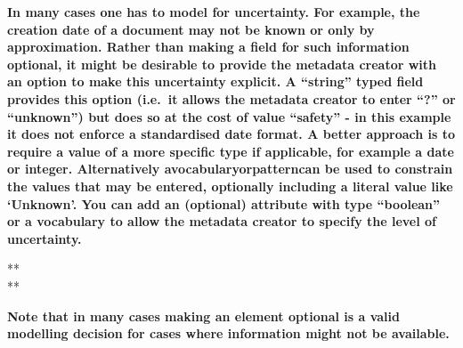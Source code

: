 \textbf{In many cases one has to model for uncertainty. For example, the
creation date of a document may not be known or only by approximation.
Rather than making a field for such information optional, it might be
desirable to provide the metadata creator with an option to make this
uncertainty explicit. A ``string'' typed field provides this option
(i.e.~it allows the metadata creator to enter ``?'' or ``unknown'') but
does so at the cost of value ``safety'' - in this example it does not
enforce a standardised date format. A better approach is to require a
value of a more specific type if applicable, for example a date or
integer. Alternatively avocabularyorpatterncan be used to constrain the
values that may be entered, optionally including a literal value like
`Unknown'. You can add an (optional) attribute with type ``boolean'' or
a vocabulary to allow the metadata creator to specify the level of
uncertainty.}

**\\
**

\textbf{Note that in many cases making an element optional is a valid
modelling decision for cases where information might not be available.}
